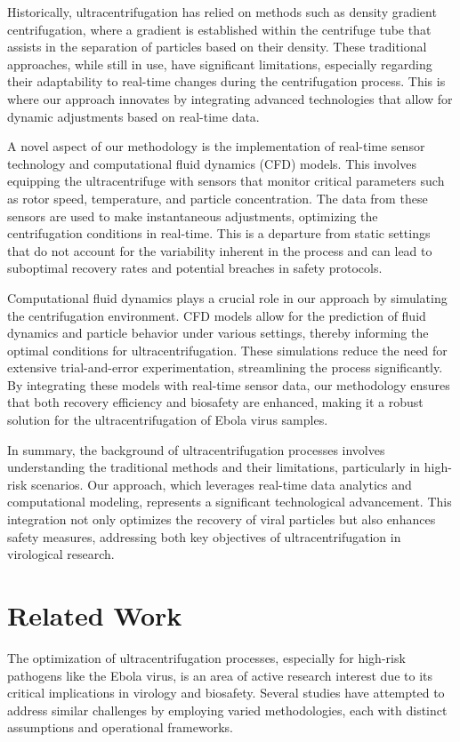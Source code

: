 \documentclass{article}
\begin{document}
Historically, ultracentrifugation has relied on methods such as density gradient centrifugation, where a gradient is established within the centrifuge tube that assists in the separation of particles based on their density. These traditional approaches, while still in use, have significant limitations, especially regarding their adaptability to real-time changes during the centrifugation process. This is where our approach innovates by integrating advanced technologies that allow for dynamic adjustments based on real-time data.

A novel aspect of our methodology is the implementation of real-time sensor technology and computational fluid dynamics (CFD) models. This involves equipping the ultracentrifuge with sensors that monitor critical parameters such as rotor speed, temperature, and particle concentration. The data from these sensors are used to make instantaneous adjustments, optimizing the centrifugation conditions in real-time. This is a departure from static settings that do not account for the variability inherent in the process and can lead to suboptimal recovery rates and potential breaches in safety protocols.

Computational fluid dynamics plays a crucial role in our approach by simulating the centrifugation environment. CFD models allow for the prediction of fluid dynamics and particle behavior under various settings, thereby informing the optimal conditions for ultracentrifugation. These simulations reduce the need for extensive trial-and-error experimentation, streamlining the process significantly. By integrating these models with real-time sensor data, our methodology ensures that both recovery efficiency and biosafety are enhanced, making it a robust solution for the ultracentrifugation of Ebola virus samples.

In summary, the background of ultracentrifugation processes involves understanding the traditional methods and their limitations, particularly in high-risk scenarios. Our approach, which leverages real-time data analytics and computational modeling, represents a significant technological advancement. This integration not only optimizes the recovery of viral particles but also enhances safety measures, addressing both key objectives of ultracentrifugation in virological research.

\section{Related Work}
The optimization of ultracentrifugation processes, especially for high-risk pathogens like the Ebola virus, is an area of active research interest due to its critical implications in virology and biosafety. Several studies have attempted to address similar challenges by employing varied methodologies, each with distinct assumptions and operational frameworks.
\end{document}
